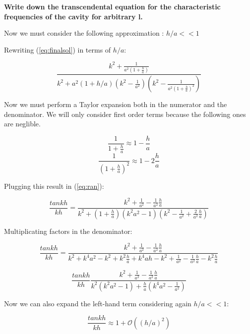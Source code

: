 \documentclass[a4paper,12pt]{article}
\begin{document}
\textbf{Write down the transcendental equation for the characteristic frequencies of the
cavity for arbitrary l.}

Now we must consider the following approximation : $ h/a << 1$

Rewriting (\ref{eq:finalsol}) in terms of $h/a$: 

\begin{equation}
\frac{k^2 + \frac{1}{a^2(1+\frac{h}{a})}}{k^2+a^2(1+h/a)(k^2-\frac{1}{a^2}) \left( k^2 - \frac{1}{a^2(1 + \frac{h}{a})^2}\right)}
\label{eq:ran}
\end{equation}

Now we must perform a Taylor expansion both in the numerator and the denominator. We will only consider first order terms because the following ones are neglible. 

\begin{equation}
\frac{1}{1+\frac{h}{a}} \approx 1 - \frac{h}{a}
\label{eq:taylor}
\end{equation}
\begin{equation}
\frac{1}{(1+\frac{h}{a})^2} \approx	 1 - 2  \frac{h}{a}
\label{eq:taylorsquare} 
\end{equation}

Plugging this result in (\ref{eq:ran}): 

\begin{equation}
\frac{tan kh}{kh} = \frac{k^2 + \frac{1}{a^2} - \frac{1}{a^2} \frac{h}{a}}{k^2 + (1+ \frac{h}{a})(k^2a^2 - 1)(k^2 - \frac{1}{a^2} + \frac{2}{a^2}\frac{h}{a})}
\end{equation}

Multiplicating factors in the denominator: 

\begin{equation}
\frac{tan kh}{kh} = \frac{k^2 + \frac{1}{a^2} - \frac{1}{a^2} \frac{h}{a}}{k^2 + k^4a^2 -k^2 + k^2 \frac{h}{a} + k^4ah - k^2 + \frac{1}{a^2}
- \frac{1}{a^2} \frac{h}{a} - k^2 \frac{h}{a}}
\end{equation}

\begin{equation}
\frac{tankh}{kh}\frac{k^2 + \frac{1}{a^2} - \frac{1}{a^2} \frac{h}{a}}{k^2(k^2a^2-1) + \frac{h}{a}(k^4a^2 -\frac{1}{a^2})}
\end{equation}

Now we can also expand the left-hand term considering again $h/a <<1$: 

\begin{equation}
\frac{tan kh}{kh} \approx 1 + \mathcal{O}((h/a)^2)
\end{equation}
\end{document}
